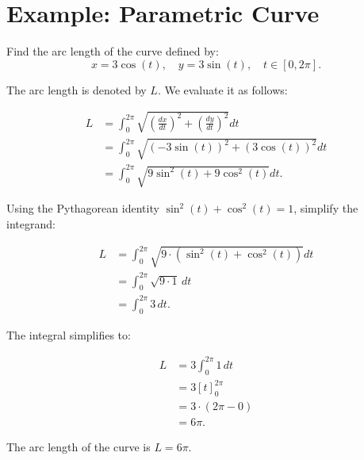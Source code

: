 \documentclass{article}
\begin{document}
\section*{Example: Parametric Curve}
\begin{examplebox}
    Find the arc length of the curve defined by:
    \[
        x = 3\cos(t), \quad y = 3\sin(t), \quad t \in [0, 2\pi].
    \]
    
    \begin{solutionbox}
        The arc length is denoted by \( L \). We evaluate it as follows:

        \begin{equation*}
            \begin{aligned}
                L &= \int_{0}^{2\pi} \sqrt{\left(\frac{dx}{dt}\right)^2 + \left(\frac{dy}{dt}\right)^2} dt \\
                &= \int_{0}^{2\pi} \sqrt{\left(-3\sin(t)\right)^2 + \left(3\cos(t)\right)^2} dt \\
                &= \int_{0}^{2\pi} \sqrt{9\sin^2(t) + 9\cos^2(t)} dt.
            \end{aligned}
        \end{equation*}
    
        Using the Pythagorean identity \( \sin^2(t) + \cos^2(t) = 1 \), simplify the integrand:
    
        \begin{equation*}
            \begin{aligned}
                L &= \int_{0}^{2\pi} \sqrt{9 \cdot (\sin^2(t) + \cos^2(t))} dt \\
                &= \int_{0}^{2\pi} \sqrt{9 \cdot 1} \, dt \\
                &= \int_{0}^{2\pi} 3 \, dt.
            \end{aligned}
        \end{equation*}
    
        The integral simplifies to:
    
        \begin{equation*}
            \begin{aligned}
                L &= 3 \int_{0}^{2\pi} 1 \, dt \\
                &= 3 \left[t\right]_{0}^{2\pi} \\
                &= 3 \cdot \left(2\pi - 0\right) \\
                &= 6\pi.
            \end{aligned}
        \end{equation*}
        \begin{answerbox}
            The arc length of the curve is \( L = 6\pi \).
        \end{answerbox}
    \end{solutionbox}
\end{examplebox}
\end{document}
